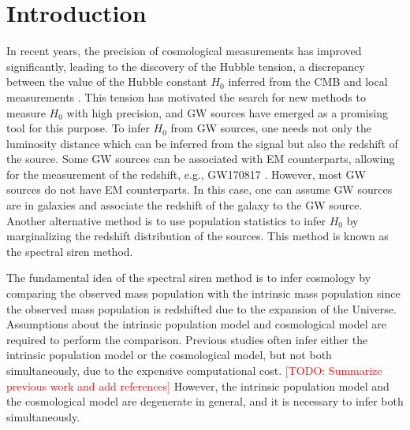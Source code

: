 \documentclass[aps,prd,twocolumn,superscriptaddress,preprintnumbers,nofootinbib,hidelinks]{revtex4-2}
\newcommand{\todo}[1]{\textcolor{red}{[TODO: #1]}}
\begin{document}
\section{Introduction}
\label{sec:introduction}

In recent years, the precision of cosmological measurements has improved significantly, leading to the discovery of the Hubble tension, a discrepancy between the value of the Hubble constant $H_0$ inferred from the \ac{CMB} \citep{Planck:2018vyg} and local measurements \citep{Riess:2021jrx}.
This tension has motivated the search for new methods to measure $H_0$ with high precision, and \ac{GW} sources have emerged as a promising tool for this purpose.
To infer $H_0$ from \ac{GW} sources, one needs not only the luminosity distance which can be inferred from the signal but also the redshift of the source.
Some \ac{GW} sources can be associated with \ac{EM} counterparts, allowing for the measurement of the redshift, e.g., GW170817 \citep{LIGOScientific:2017adf, Guidorzi:2017ogy}.
However, most \ac{GW} sources do not have \ac{EM} counterparts.
In this case, one can assume \ac{GW} sources are in galaxies and associate the redshift of the galaxy to the \ac{GW} source. \citep{Schutz:1986gp, DelPozzo:2011vcw, Gray:2019ksv, Gray:2023wgj}
Another alternative method is to use population statistics to infer $H_0$ by marginalizing the redshift distribution of the sources.
This method is known as the spectral siren method\citep{You:2020wju, Mastrogiovanni:2021wsd, LIGOScientific:2021aug, Ezquiaga:2022zkx}.

The fundamental idea of the spectral siren method is to infer cosmology by comparing the observed mass population with the intrinsic mass population since the observed mass population is redshifted due to the expansion of the Universe.
Assumptions about the intrinsic population model and cosmological model are required to perform the comparison.
Previous studies often infer either the intrinsic population model or the cosmological model, but not both simultaneously, due to the expensive computational cost.
\todo{Summarize previous work and add references}
However, the intrinsic population model and the cosmological model are degenerate in general, and it is necessary to infer both simultaneously.
\end{document}
